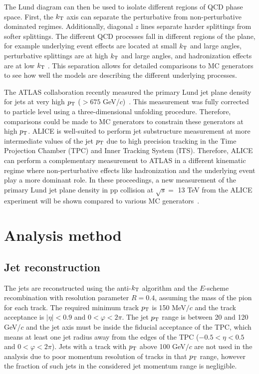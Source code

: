 \documentclass{PoS}
\begin{document}
The Lund diagram can then be used to isolate different regions of QCD phase space. First, the $k_{\rm T}$ axis can separate the perturbative from non-perturbative dominated regimes. Additionally, diagonal $z$ lines separate harder splittings from softer splittings. The different QCD processes fall in different regions of the plane, for example underlying event effects are located at small $k_{\rm T}$ and large angles, perturbative splittings are at high $k_{\rm T}$  and large angles, and hadronization effects are at low $k_{\rm T}$ . This separation allows for detailed comparisons to MC generators to see how well the models are describing the different underlying processes. 

The ATLAS collaboration recently measured the primary Lund jet plane density for jets at very high $p_{\rm T}$ ($ > 675$ GeV/$c$)~\cite{Aad:2020zcn}. This measurement was fully corrected to particle level using a three-dimensional unfolding procedure. Therefore, comparisons could be made to MC generators to constrain these generators at high $p_{\rm T}$. ALICE is well-suited to perform jet substructure measurement at more intermediate values of the jet $p_{\rm T}$ due to high precision tracking in the Time Projection Chamber (TPC) and Inner Tracking System (ITS). Therefore, ALICE can perform a complementary measurement to ATLAS in a different kinematic regime where non-perturbative effects like hadronization and the underlying event play a more dominant role. In these proceedings, a new measurement of the primary Lund jet plane density in pp collision at $\sqrt{s} = $ 13 TeV from the ALICE experiment will be shown compared to various MC generators~\cite{ALICE-PUBLIC-2021-002}. 

\section{Analysis method}

\subsection{Jet reconstruction}
The jets are reconstructed using the anti-$k_{\rm T}$ algorithm \cite{FastJetAntikt} and the $E$-scheme \cite{Cacciari:2011ma} recombination with resolution parameter $R=0.4$, assuming the mass of the pion for each track. The required minimum track $p_{\rm T}$ is 150 MeV$/c$ and the track acceptance is $|\eta| < 0.9$ and $0 < \varphi < 2\pi$. The jet $p_{\rm T}$ range is between 20 and 120 GeV/$c$ and the jet axis must be inside the fiducial acceptance of the TPC, which means at least one jet radius away from the edges of the TPC ($-0.5 < \eta < 0.5$ and $0 < \varphi < 2\pi$). Jets with a track with $p_{\rm T}$ above 100 GeV$/c$ are not used in the analysis due to poor momentum resolution of tracks in that $p_{\rm T}$ range, however the fraction of such jets in the considered jet momentum range is negligible. 
\end{document}
